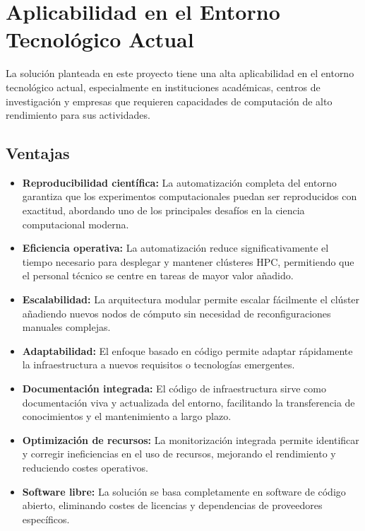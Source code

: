 \documentclass[12pt,a4paper]{report}
\begin{document}
\section{Aplicabilidad en el Entorno Tecnológico Actual}

La solución planteada en este proyecto tiene una alta aplicabilidad en el entorno tecnológico actual, especialmente en instituciones académicas, centros de investigación y empresas que requieren capacidades de computación de alto rendimiento para sus actividades.

\subsection{Ventajas}

\begin{itemize}
    \item \textbf{Reproducibilidad científica:} La automatización completa del entorno garantiza que los experimentos computacionales puedan ser reproducidos con exactitud, abordando uno de los principales desafíos en la ciencia computacional moderna.
    
    \item \textbf{Eficiencia operativa:} La automatización reduce significativamente el tiempo necesario para desplegar y mantener clústeres HPC, permitiendo que el personal técnico se centre en tareas de mayor valor añadido.
    
    \item \textbf{Escalabilidad:} La arquitectura modular permite escalar fácilmente el clúster añadiendo nuevos nodos de cómputo sin necesidad de reconfiguraciones manuales complejas.
    
    \item \textbf{Adaptabilidad:} El enfoque basado en código permite adaptar rápidamente la infraestructura a nuevos requisitos o tecnologías emergentes.
    
    \item \textbf{Documentación integrada:} El código de infraestructura sirve como documentación viva y actualizada del entorno, facilitando la transferencia de conocimientos y el mantenimiento a largo plazo.
    
    \item \textbf{Optimización de recursos:} La monitorización integrada permite identificar y corregir ineficiencias en el uso de recursos, mejorando el rendimiento y reduciendo costes operativos.
    
    \item \textbf{Software libre:} La solución se basa completamente en software de código abierto, eliminando costes de licencias y dependencias de proveedores específicos.
\end{itemize}
\end{document}
